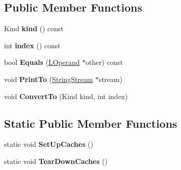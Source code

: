 \subsection*{Public Member Functions}
\begin{DoxyCompactItemize}
\item 
Kind {\bfseries kind} () const \hypertarget{classv8_1_1internal_1_1_l_operand_a2f1cbe5591b8438601fffcf10aae8f4a}{}\label{classv8_1_1internal_1_1_l_operand_a2f1cbe5591b8438601fffcf10aae8f4a}

\item 
int {\bfseries index} () const \hypertarget{classv8_1_1internal_1_1_l_operand_a092df8bd2e8ad16f9dfa51b193dd3938}{}\label{classv8_1_1internal_1_1_l_operand_a092df8bd2e8ad16f9dfa51b193dd3938}

\item 
bool {\bfseries Equals} (\hyperlink{classv8_1_1internal_1_1_l_operand}{L\+Operand} $\ast$other) const \hypertarget{classv8_1_1internal_1_1_l_operand_affa743246d0ccd14b6cc106d548f6e21}{}\label{classv8_1_1internal_1_1_l_operand_affa743246d0ccd14b6cc106d548f6e21}

\item 
void {\bfseries Print\+To} (\hyperlink{classv8_1_1internal_1_1_string_stream}{String\+Stream} $\ast$stream)\hypertarget{classv8_1_1internal_1_1_l_operand_a684de6da71cf754c32dac9653b2b63b0}{}\label{classv8_1_1internal_1_1_l_operand_a684de6da71cf754c32dac9653b2b63b0}

\item 
void {\bfseries Convert\+To} (Kind kind, int index)\hypertarget{classv8_1_1internal_1_1_l_operand_a013eb1382dbc447b932e2fea6a2180df}{}\label{classv8_1_1internal_1_1_l_operand_a013eb1382dbc447b932e2fea6a2180df}

\end{DoxyCompactItemize}
\subsection*{Static Public Member Functions}
\begin{DoxyCompactItemize}
\item 
static void {\bfseries Set\+Up\+Caches} ()\hypertarget{classv8_1_1internal_1_1_l_operand_aa7caa89f1f00651c0e70b732fe400c04}{}\label{classv8_1_1internal_1_1_l_operand_aa7caa89f1f00651c0e70b732fe400c04}

\item 
static void {\bfseries Tear\+Down\+Caches} ()\hypertarget{classv8_1_1internal_1_1_l_operand_a859c53c343e869f24d3eae5d57e5f906}{}\label{classv8_1_1internal_1_1_l_operand_a859c53c343e869f24d3eae5d57e5f906}

\end{DoxyCompactItemize}

